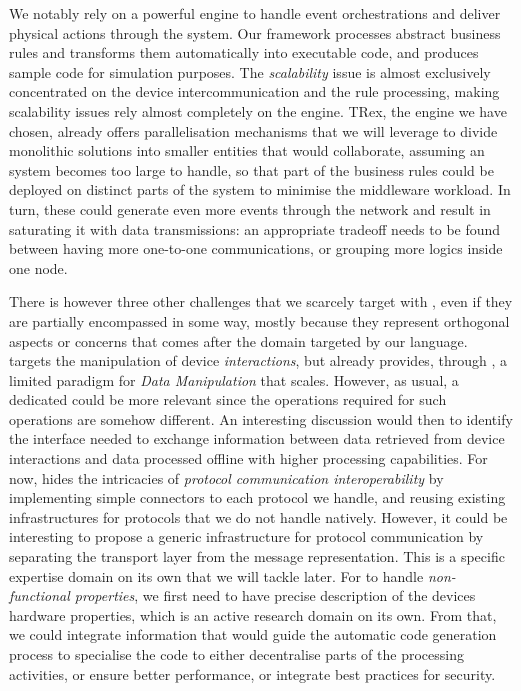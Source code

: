 We notably rely on a powerful \CEP engine to handle event orchestrations and deliver physical actions through the system. Our framework processes abstract business rules and transforms them automatically into executable code, and produces sample code for simulation purposes. The \emph{scalability} issue is almost exclusively concentrated on the device intercommunication and the rule processing, making scalability issues rely almost completely on the \CEP engine. TRex, the engine we have chosen, already offers parallelisation mechanisms that we will leverage to divide monolithic solutions into smaller entities that would collaborate, assuming an \IOT system becomes too large to handle, so that part of the business rules could be deployed on distinct parts of the system to minimise the middleware workload. In turn, these could generate even more events through the network and result in saturating it with data transmissions: an appropriate tradeoff needs to be found between having more one-to-one communications, or grouping more logics inside one node.

There is however three other challenges that we scarcely target with \IOTDSL, even if they are partially encompassed in some way, mostly because they represent orthogonal aspects or concerns that comes after the domain targeted by our language. \IOTDSL targets the manipulation of device \emph{interactions}, but already provides, through \CEP, a limited paradigm for \emph{Data Manipulation} that scales. However, as usual, a dedicated \DSL could be more relevant since the operations required for such operations are somehow different. An interesting discussion would then to identify the interface needed to exchange information between data retrieved from device interactions and data processed offline with higher processing capabilities. For now, \IOTDSL hides the intricacies of \emph{protocol communication interoperability} by implementing simple connectors to each protocol we handle, and reusing existing infrastructures for protocols that we do not handle natively. However, it could be interesting to propose a generic infrastructure for protocol communication by separating the transport layer from the message representation. This is a specific expertise domain on its own that we will tackle later. For \IOTDSL to handle \emph{non-functional properties}, we first need to have precise description of the devices hardware properties, which is an active research domain on its own. From that, we could integrate information that would guide the automatic code generation process to specialise the code to either decentralise parts of the processing activities, or ensure better performance, or integrate best practices for security.

